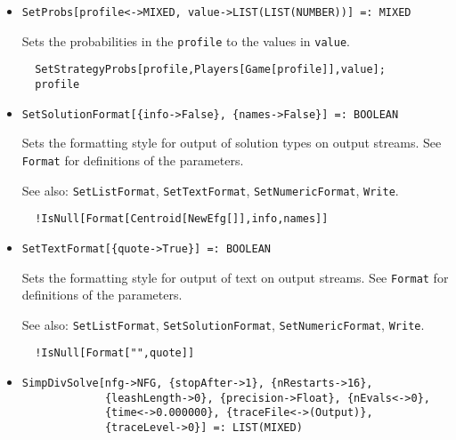 \begin{itemize}
\item{}
\protect \large \begin{verbatim}
SetProbs[profile<->MIXED, value->LIST(LIST(NUMBER))] =: MIXED 
\end{verbatim}\normalsize

\bd 
Sets the probabilities in the \verb+profile+ to the values in
\verb+value+.  
\begin{verbatim}
  SetStrategyProbs[profile,Players[Game[profile]],value];
  profile
\end{verbatim} 
\ed

\item{}
\protect \large \begin{verbatim}
SetSolutionFormat[{info->False}, {names->False}] =: BOOLEAN 
\end{verbatim}\normalsize

\bd Sets the formatting style for output of solution types on output
streams.  See \verb+Format+ for definitions of the parameters.
\item [See also:] \verb+SetListFormat+, \verb+SetTextFormat+, 
\verb+SetNumericFormat+, \verb+Write+.
\begin{verbatim}
  !IsNull[Format[Centroid[NewEfg[]],info,names]]
\end{verbatim} 
\ed

\item{}
\protect \large \begin{verbatim}
SetTextFormat[{quote->True}] =: BOOLEAN 
\end{verbatim}\normalsize

\bd 
Sets the formatting style for output of text on output streams.
See \verb+Format+ for definitions of the parameters.
\item [See also:] \verb+SetListFormat+, \verb+SetSolutionFormat+, 
\verb+SetNumericFormat+, \verb+Write+.
\begin{verbatim}
  !IsNull[Format["",quote]]
\end{verbatim} 
\ed

\item{}
\protect \large \begin{verbatim}
SimpDivSolve[nfg->NFG, {stopAfter->1}, {nRestarts->16}, 
             {leashLength->0}, {precision->Float}, {nEvals<->0}, 
             {time<->0.000000}, {traceFile<->(Output)}, 
             {traceLevel->0}] =: LIST(MIXED) 
\end{verbatim}\normalsize


\end{itemize}
